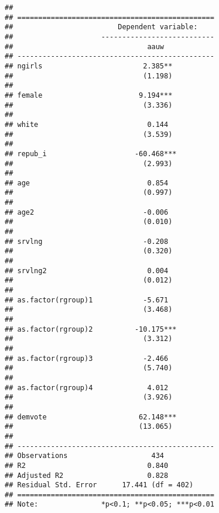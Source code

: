 \documentclass[
]{article}
\begin{document}
\begin{verbatim}
## 
## ===============================================
##                         Dependent variable:    
##                     ---------------------------
##                                aauw            
## -----------------------------------------------
## ngirls                        2.385**          
##                               (1.198)          
##                                                
## female                       9.194***          
##                               (3.336)          
##                                                
## white                          0.144           
##                               (3.539)          
##                                                
## repub_i                     -60.468***         
##                               (2.993)          
##                                                
## age                            0.854           
##                               (0.997)          
##                                                
## age2                          -0.006           
##                               (0.010)          
##                                                
## srvlng                        -0.208           
##                               (0.320)          
##                                                
## srvlng2                        0.004           
##                               (0.012)          
##                                                
## as.factor(rgroup)1            -5.671           
##                               (3.468)          
##                                                
## as.factor(rgroup)2          -10.175***         
##                               (3.312)          
##                                                
## as.factor(rgroup)3            -2.466           
##                               (5.740)          
##                                                
## as.factor(rgroup)4             4.012           
##                               (3.926)          
##                                                
## demvote                      62.148***         
##                              (13.065)          
##                                                
## -----------------------------------------------
## Observations                    434            
## R2                             0.840           
## Adjusted R2                    0.828           
## Residual Std. Error      17.441 (df = 402)     
## ===============================================
## Note:               *p<0.1; **p<0.05; ***p<0.01
\end{verbatim}
\end{document}
